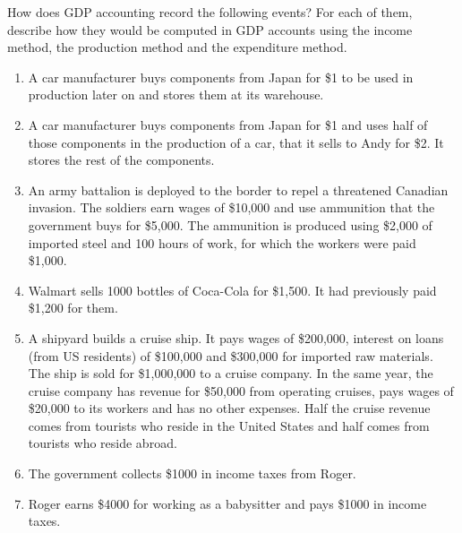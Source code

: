 \noindent How does GDP accounting record the following events? For each of them, describe how they would be computed in GDP
accounts using the income method, the production method and the expenditure method.
\begin{enumerate}[label=(\alph*),leftmargin=2.2em,topsep=2pt,itemsep=1pt]
\item A car manufacturer buys components from Japan for \$1 to be used in production later on and stores them at its warehouse.
\item A car manufacturer buys components from Japan for \$1 and uses half of those components in the production of a car, that it
sells to Andy for \$2. It stores the rest of the components.
\item An army battalion is deployed to the border to repel a threatened Canadian invasion. The soldiers earn wages of \$10,000 and
use ammunition that the government buys for \$5,000. The ammunition is produced using \$2,000 of imported steel and 100 hours of
work, for which the workers were paid \$1,000.
\item Walmart sells 1000 bottles of Coca-Cola for \$1,500. It had previously paid \$1,200 for them.
\item A shipyard builds a cruise ship. It pays wages of \$200,000, interest on loans (from US residents) of \$100,000 and \$300,000
for imported raw materials. The ship is sold for \$1,000,000 to a cruise company. In the same year, the cruise company has revenue
for \$50,000 from operating cruises, pays wages of \$20,000 to its workers and has no other expenses. Half the cruise revenue comes
from tourists who reside in the United States and half comes from tourists who reside abroad.
\item The government collects \$1000 in income taxes from Roger.
\item Roger earns \$4000 for working as a babysitter and pays \$1000 in income taxes.
\end{enumerate}
\resolespaco
